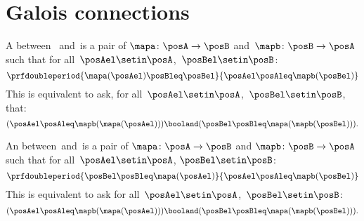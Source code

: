 

\section{Galois connections}\label{subsec:galois-connections}

\begin{ctdefinition}\label{def:monotone-galois-connection}
    A  between ~\posA and~\posB is a pair of 
    $\mapa\colon \posA\to \posB$ and~$\mapb\colon \posB\to \posA$ such that for all~$\posAel\setin \posA$,~$\posBel\setin \posB$:
    \begin{equation}
        \prfdoubleperiod{\mapa(\posAel) \posBleq \posBel}{\posAel \posAleq \mapb(\posBel)}
    \end{equation}
    This is equivalent to ask, for all~$\posAel\setin \posA$,~$\posBel\setin \posB$, that:
    \begin{equation}
        (\posAel\posAleq \mapb(\mapa(\posAel)))
        \booland (\posBel\posBleq \mapa(\mapb(\posBel))).
    \end{equation}
\end{ctdefinition}

\begin{ctdefinition}\label{def:antitone-galois-connection}
    An  between~\posA and~\posB is a pair of  $\mapa\colon \posA\to \posB$ and $\mapb \colon \posB\to \posA$ such that for all~$\posAel\setin \posA$, $\posBel\setin \posB$:
    \begin{equation}
        \prfdoubleperiod{\posBel \posBleq \mapa(\posAel)}{\posAel \posAleq \mapb(\posBel)}
    \end{equation}
    This is equivalent to ask for all~$\posAel\setin \posA$,~$\posBel\setin \posB$:
    \begin{equation}
        (\posAel \posAleq \mapb(\mapa(\posAel)))
        \booland  (\posBel \posBleq \mapa(\mapb(\posBel))).
    \end{equation}
\end{ctdefinition}


